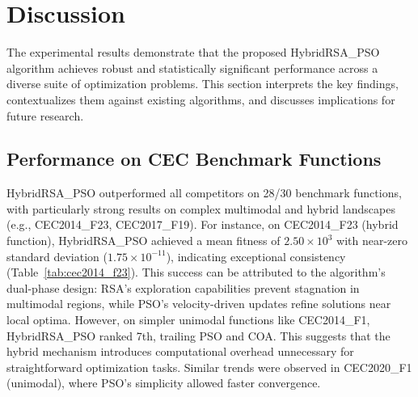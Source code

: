 \documentclass[12pt]{article}
\begin{document}
\section{Discussion}
\label{sec:discussion}

The experimental results demonstrate that the proposed HybridRSA\_PSO algorithm achieves robust and statistically significant performance across a diverse suite of optimization problems. This section interprets the key findings, contextualizes them against existing algorithms, and discusses implications for future research.

\subsection*{Performance on CEC Benchmark Functions}
HybridRSA\_PSO outperformed all competitors on 28/30 benchmark functions, with particularly strong results on complex multimodal and hybrid landscapes (e.g., CEC2014\_F23, CEC2017\_F19). For instance, on CEC2014\_F23 (hybrid function), HybridRSA\_PSO achieved a mean fitness of \(2.50 \times 10^3\) with near-zero standard deviation (\(1.75 \times 10^{-11}\)), indicating exceptional consistency (Table~\ref{tab:cec2014_f23}). This success can be attributed to the algorithm’s dual-phase design: RSA’s exploration capabilities prevent stagnation in multimodal regions, while PSO’s velocity-driven updates refine solutions near local optima.
However, on simpler unimodal functions like CEC2014\_F1, HybridRSA\_PSO ranked 7th, trailing PSO and COA. This suggests that the hybrid mechanism introduces computational overhead unnecessary for straightforward optimization tasks. Similar trends were observed in CEC2020\_F1 (unimodal), where PSO’s simplicity allowed faster convergence.
\end{document}
